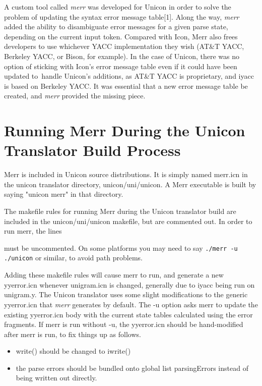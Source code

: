 \documentclass[letterpaper]{article}
\begin{document}
A custom tool called {\em merr\/} was developed for Unicon in order to
solve the problem of updating the syntax error message table[1].  Along
the way, {\em merr\/} added the ability to disambiguate error
messages for a given parse state, depending on the current input token.
Compared with Icon, Merr also frees developers to use whichever
YACC implementation they wish (AT\&T YACC, Berkeley YACC, or Bison,
for example). In the case of Unicon, there was no option of sticking
with Icon's error message table even if it could have been updated to\
handle Unicon's additions, as AT\&T YACC is proprietary, and
iyacc is based on Berkeley YACC. It was essential that a new error
message table be created, and {\em merr\/} provided the missing piece.

\section{Running Merr During the Unicon Translator Build Process}

Merr is included in Unicon source distributions. It is simply named
merr.icn in the unicon translator directory, unicon/uni/unicon.
A Merr executable is built by saying "unicon merr" in that directory.

The makefile rules for running Merr during the Unicon translator build
are included in the unicon/uni/unicon makefile, but are commented out.
In order to run merr, the lines


\noindent must be uncommented.  On some platforms you may need to say
\texttt{./merr -u ./unicon} or similar, to avoid path problems.

Adding these makefile rules will cause merr to run, and generate a new
yyerror.icn whenever unigram.icn is changed, generally due to iyacc
being run on unigram.y.  The Unicon translator uses some slight
modifications to the generic yyerror.icn that {\em merr\/} generates
by default. The -u option asks merr to update the existing yyerror.icn
body with the current state tables calculated using the error fragments.
If merr is run without -u, the yyerror.icn should be hand-modified after
merr is run, to fix things up as follows.

\begin{itemize}
\item write() should be changed to iwrite()
\item the parse errors should be bundled onto global list
      parsingErrors instead of being written out directly.
\end{itemize}
\end{document}
